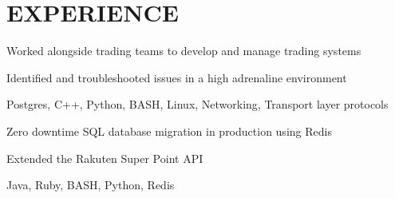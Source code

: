 \documentclass[letterpaper]{deedy-resume-openfont} %
\begin{document}
\hfill
%
%
\begin{minipage}[t]{0.66\textwidth} %
\section{EXPERIENCE}
\vspace{\topsep} %
\begin{tightemize}
\item Worked alongside trading teams to develop and manage trading systems
\item Identified and troubleshooted issues in a high adrenaline environment
\item Postgres, C++, Python, BASH, Linux, Networking, Transport layer protocols
\end{tightemize}
\sectionsep %
\begin{tightemize}
\item Zero downtime SQL database migration in production using Redis \\
\item Extended the Rakuten Super Point API \\  
\item Java, Ruby, BASH, Python, Redis
\end{tightemize}
\sectionsep %

\end{minipage}
\end{document}
